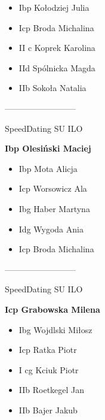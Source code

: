 \documentclass[a4paper,10pt]{article}
\begin{document}
\begin{multicols}{3}
\begin{minipage}[l]{\textwidth}
  \begin{itemize}
    \item Ibp Kołodziej Julia
    \item Icp Broda Michalina
    \item II c Koprek Karolina
    \item IId  Spólnicka Magda
    \item IIb Sokoła Natalia

    \end{itemize}



\end{minipage}



\begin{minipage}[l]{\textwidth}
--------------------------

  \footnotesize{SpeedDating SU ILO}

  \bfseries{Ibp Olesiński Maciej}

  \begin{itemize}
    \item Ibp Mota Alicja
    \item Icp Worsowicz Ala
    \item Ibg Haber Martyna
    \item Idg Wygoda Ania
    \item Icp Broda Michalina

    \end{itemize}



\end{minipage}



\begin{minipage}[l]{\textwidth}
--------------------------

  \footnotesize{SpeedDating SU ILO}

  \bfseries{Icp Grabowska Milena}

  \begin{itemize}
    \item Ibg Wojdlski Miłosz
    \item Icp Ratka Piotr
    \item I cg Kciuk Piotr
    \item IIb Roetkegel Jan
    \item IIb Bajer Jakub

    \end{itemize}




\end{minipage}
\end{multicols}
\end{document}
